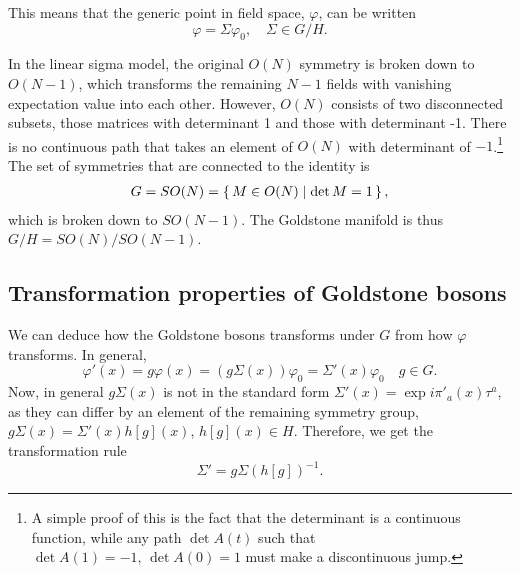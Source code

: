 This means that the generic point in field space, $\varphi$, can be written
\begin{equation*}
    \varphi = \Sigma \varphi_0, \quad \Sigma \in G/H.
\end{equation*}


In the linear sigma model, the original $O(N)$ symmetry is broken down to $O(N-1)$, which transforms the remaining $N-1$ fields with vanishing expectation value into each other.
However, $O(N)$ consists of two disconnected subsets, those matrices with determinant 1 and those with determinant -1.
There is no continuous path that takes an element of $O(N)$ with determinant of $-1$.\footnote{A simple proof of this is the fact that the determinant is a continuous function, while any path $\det A(t)$ such that $\det A(1) = -1,\, \det A(0) = 1$ must make a discontinuous jump.}
The set of symmetries that are connected to the identity is
\begin{eqnarray}
    G = SO(N) = \left\{\, M \in O(N) \mid  \det M = 1 \,\right\},
\end{eqnarray}
which is broken down to $SO(N-1)$.
The Goldstone manifold is thus $G/H = SO(N) / SO(N-1)$.

\subsection*{Transformation properties of Goldstone bosons}
We can deduce how the Goldstone bosons transforms under $G$ from how $\varphi$ transforms.
In general, 
\begin{equation}
    \varphi'(x) = g \varphi(x) = (g \Sigma(x)) \varphi_0 = \Sigma'(x) \varphi_0 \quad g \in G.
\end{equation}
Now, in general $g \Sigma(x)$ is not in the standard form $\Sigma'(x) = \exp{i \pi'_a(x)\tau^a}$, as they can differ by an element of the remaining symmetry group, $g\Sigma(x) = \Sigma'(x) h[g](x)$, $h[g](x) \in H$.
Therefore, we get the transformation rule
\begin{equation}
    \Sigma' = g \Sigma (h[g])^{-1}.
\end{equation}
